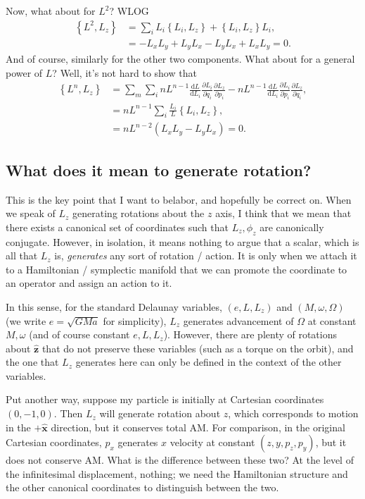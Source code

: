 \documentclass[12pt]{article}
\newcommand*{\rd}[2]{\frac{\mathrm{d}#1}{\mathrm{d}#2}}
\newcommand*{\pd}[2]{\frac{\partial#1}{\partial#2}}
\newcommand*{\bm}[1]{\boldsymbol{\mathbf{#1}}}
\newcommand*{\uv}[1]{\hat{\bm{#1}}}
\newcommand*{\p}[1]{\left(#1\right)}
\newcommand*{\z}[1]{\left\{#1\right\}}
\begin{document}
Now, what about for $L^2$? WLOG
\begin{align*}
    \z{L^2, L_z} &= \sum\limits_i L_i\z{L_i, L_z} + \z{L_i, L_z}L_i,\\
        &= -L_x L_y + L_yL_x - L_yL_x + L_xL_y = 0.
\end{align*}
And of course, similarly for the other two components. What about for a general
power of $L$? Well, it's not hard to show that
\begin{align*}
    \z{L^n, L_z}
        &= \sum\limits_m \sum\limits_i
            nL^{n-1}\rd{L}{L_i}\pd{L_i}{q_i}\pd{L_z}{p_i}
            - nL^{n-1}\rd{L}{L_i}\pd{L_i}{p_i}\pd{L_z}{q_i},\\
        &= nL^{n-1}\sum\limits_i\frac{L_i}{L}\z{L_i, L_z},\\
        &= nL^{n-2}\p{L_xL_y - L_yL_x} = 0.
\end{align*}

\subsection{What does it mean to generate rotation?}

This is the key point that I want to belabor, and hopefully be correct on. When
we speak of $L_z$ generating rotations about the $z$ axis, I think that we mean
that there exists a canonical set of coordinates such that $L_z, \phi_z$ are
canonically conjugate. However, in isolation, it means nothing to argue that a
scalar, which is all that $L_z$ is, \emph{generates} any sort of rotation /
action. It is only when we attach it to a Hamiltonian / symplectic manifold that
we can promote the coordinate to an operator and assign an action to it.

In this sense, for the standard Delaunay variables, $(e, L, L_z)$ and $(M,
\omega, \Omega)$ (we write $e = \sqrt{GMa}$ for simplicity), $L_z$ generates
advancement of $\Omega$ at constant $M, \omega$ (and of course constant $e, L,
L_z$). However, there are plenty of rotations about $\uv{z}$ that do not
preserve these variables (such as a torque on the orbit), and the one that $L_z$
generates here can only be defined in the context of the other variables.

Put another way, suppose my particle is initially at Cartesian coordinates $(0,
-1, 0)$. Then $L_z$ will generate rotation about $z$, which corresponds to
motion in the $+\uv{x}$ direction, but it conserves total AM\@. For comparison, in
the original Cartesian coordinates, $p_x$ generates $x$ velocity at constant
$(z, y, p_z, p_y)$, but it does not conserve AM\@. What is the difference between
these two? At the level of the infinitesimal displacement, nothing; we need the
Hamiltonian structure and the other canonical coordinates to distinguish between
the two.
\end{document}
